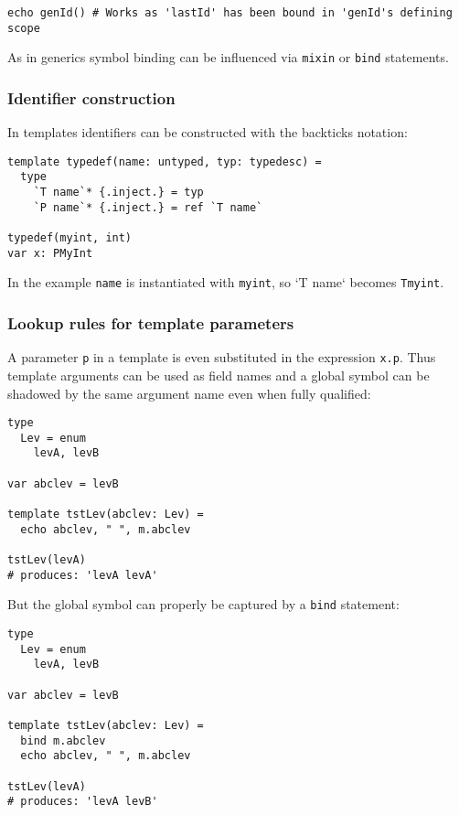 \begin{verbatim}
echo genId() # Works as 'lastId' has been bound in 'genId's defining scope
\end{verbatim}

As in generics symbol binding can be influenced via \texttt{mixin} or
\texttt{bind} statements.

\hypertarget{identifier-construction}{%
\subsubsection{Identifier construction}\label{identifier-construction}}

In templates identifiers can be constructed with the backticks notation:

\begin{verbatim}
template typedef(name: untyped, typ: typedesc) =
  type
    `T name`* {.inject.} = typ
    `P name`* {.inject.} = ref `T name`

typedef(myint, int)
var x: PMyInt
\end{verbatim}

In the example \texttt{name} is instantiated with \texttt{myint}, so `T
name` becomes \texttt{Tmyint}.

\hypertarget{lookup-rules-for-template-parameters}{%
\subsubsection{Lookup rules for template
parameters}\label{lookup-rules-for-template-parameters}}

A parameter \texttt{p} in a template is even substituted in the
expression \texttt{x.p}. Thus template arguments can be used as field
names and a global symbol can be shadowed by the same argument name even
when fully qualified:

\begin{verbatim}
type
  Lev = enum
    levA, levB

var abclev = levB

template tstLev(abclev: Lev) =
  echo abclev, " ", m.abclev

tstLev(levA)
# produces: 'levA levA'
\end{verbatim}

But the global symbol can properly be captured by a \texttt{bind}
statement:

\begin{verbatim}
type
  Lev = enum
    levA, levB

var abclev = levB

template tstLev(abclev: Lev) =
  bind m.abclev
  echo abclev, " ", m.abclev

tstLev(levA)
# produces: 'levA levB'
\end{verbatim}


